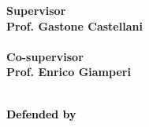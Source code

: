 \begin{titlepage}
    \begin{minipage}[t]{0.47\textwidth}
        {\large{\bf Supervisor \vspace{2mm}\\
        Prof. Gastone Castellani\\\\
        \bf Co-supervisor %
        \vspace{2mm}\\
        Prof. Enrico Giamperi\\\\}}
    \end{minipage}
    \hfill
    \begin{minipage}[L]{0.40\textwidth} \textcolor{black}{
        {\large{\bf  Defended by
        \vspace{2mm}\\
        }}
        }
    \end{minipage}
    
\end{titlepage}